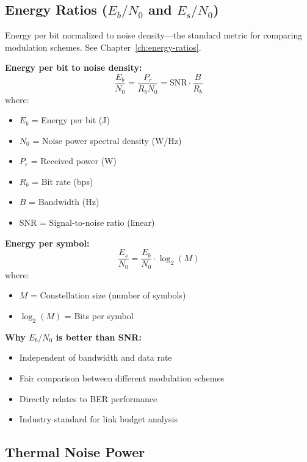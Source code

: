 \subsection{Energy Ratios ($E_b/N_0$ and $E_s/N_0$)}
\label{sec:energy-ratios}

Energy per bit normalized to noise density---the standard metric for comparing modulation schemes. See Chapter~\ref{ch:energy-ratios}.

\textbf{Energy per bit to noise density:}
\begin{equation}
\frac{E_b}{N_0} = \frac{P_r}{R_b N_0} = \text{SNR} \cdot \frac{B}{R_b}
\label{eq:eb-n0}
\end{equation}
where:
\begin{itemize}
\item $E_b$ = Energy per bit (J)
\item $N_0$ = Noise power spectral density (W/Hz)
\item $P_r$ = Received power (W)
\item $R_b$ = Bit rate (bps)
\item $B$ = Bandwidth (Hz)
\item SNR = Signal-to-noise ratio (linear)
\end{itemize}

\textbf{Energy per symbol:}
\begin{equation}
\frac{E_s}{N_0} = \frac{E_b}{N_0} \cdot \log_2(M)
\label{eq:es-n0}
\end{equation}
where:
\begin{itemize}
\item $M$ = Constellation size (number of symbols)
\item $\log_2(M)$ = Bits per symbol
\end{itemize}

\begin{keyconcept}
\textbf{Why $E_b/N_0$ is better than SNR:}
\begin{itemize}
\item Independent of bandwidth and data rate
\item Fair comparison between different modulation schemes
\item Directly relates to BER performance
\item Industry standard for link budget analysis
\end{itemize}
\end{keyconcept}

\subsection{Thermal Noise Power}
\label{sec:thermal-noise}

